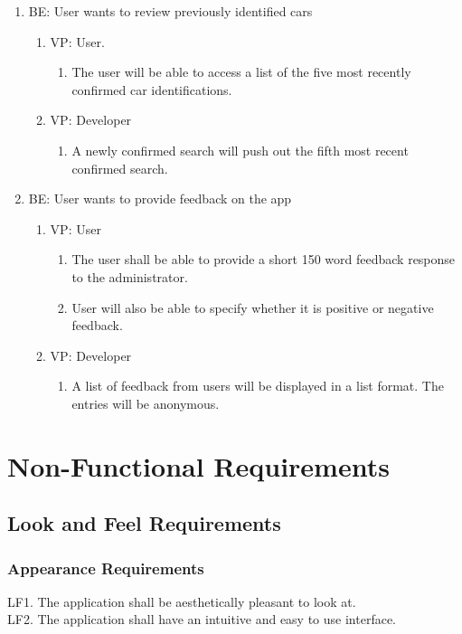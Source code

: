 \documentclass[12pt]{article}
\begin{document}
\begin{enumerate}
	\item BE: User wants to review previously identified cars
	\begin{enumerate}
		\item VP: User.
		\begin{enumerate}
			\item The user will be able to access a list of the five most recently confirmed car identifications.
		\end{enumerate}
		\item VP: Developer
		\begin{enumerate}
			\item A newly confirmed search will push out the fifth most recent confirmed search.
		\end{enumerate}
	\end{enumerate}

	\item BE: User wants to provide feedback on the app
	\begin{enumerate}
		\item VP: User
		\begin{enumerate}
			\item The user shall be able to provide a short 150 word feedback response to the administrator.
			\item User will also be able to specify whether it is positive or negative feedback.
		\end{enumerate}
		\item VP: Developer
		\begin{enumerate}
			\item A list of feedback from users will be displayed in a list format. The entries will be anonymous.
		\end{enumerate}
	\end{enumerate}

\end{enumerate}

\section{Non-Functional Requirements}
\subsection{Look and Feel Requirements}
\subsubsection{Appearance Requirements}
LF1. The application shall be aesthetically pleasant to look at.\\
LF2. The application shall have an intuitive and easy to use interface.
\end{document}
